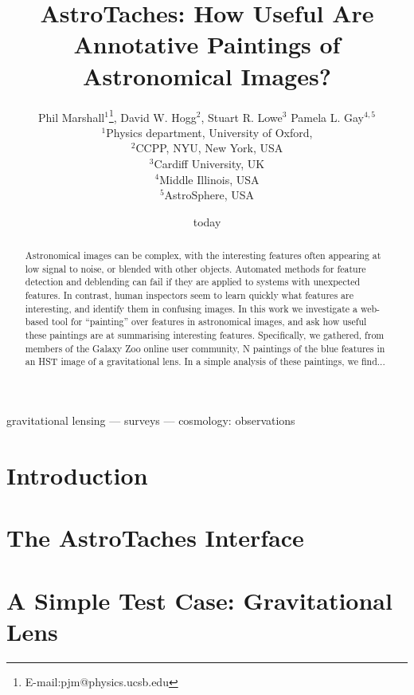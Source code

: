 \documentclass[useAMS,usenatbib]{mn2e}
\title%
[Astronomical Image Annotation]%
{AstroTaches: How Useful Are Annotative Paintings of Astronomical Images?}
\author%
[Marshall et al]%
{Phil Marshall$^{1}$\thanks{E-mail:pjm@physics.ucsb.edu}, 
David W. Hogg$^{2}$,
Stuart R. Lowe$^{3}$
\newauthor Pamela L. Gay$^{4,5}$\\
$^{1}$Physics department, University of Oxford, \\
$^{2}$CCPP, NYU, New York, USA\\
$^{3}$Cardiff University, UK\\
$^{4}$Middle Illinois, USA\\
$^{5}$AstroSphere, USA}
\date{today}
\begin{document}
\maketitle


\begin{abstract}

Astronomical images can be complex, with the interesting features often
appearing at low signal to noise, or blended with other objects. Automated
methods for feature detection and deblending can fail if they are applied to
systems with unexpected features. In contrast,  human inspectors seem to learn
quickly what features are interesting, and identify them in confusing images.
In this work we investigate a web-based tool for ``painting'' over features in
astronomical images, and ask how useful these paintings are at summarising
interesting features. Specifically, we gathered, from members of the Galaxy
Zoo online user community, N paintings of the blue features in an HST image of
a gravitational lens. In a simple analysis of these paintings, we find...

\end{abstract}


\begin{keywords}
gravitational lensing --- surveys --- cosmology: observations
\end{keywords}



\section{Introduction}



\section{The AstroTaches Interface}
\label{sect:interface}




\section{A Simple Test Case: Gravitational Lens \lens}
\label{sect:testcase}
\end{document}
